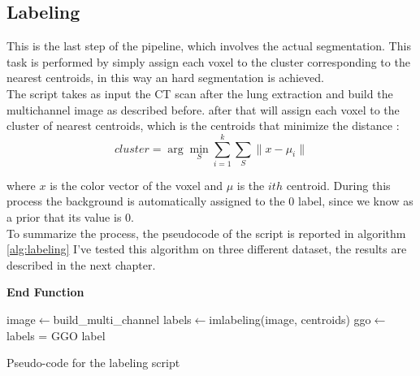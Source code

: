 
	
	\subsection{Labeling}
	
	This is the last step of the pipeline, which involves the actual segmentation. This task is performed by simply assign each voxel to the cluster corresponding to the nearest centroids, in this way an hard segmentation is achieved.\\
	
	The script takes as input the CT scan after the lung extraction and build the multichannel image as described before. after that will assign each voxel to the cluster of nearest centroids, which is the centroids that minimize the distance : 
	\begin{equation}
		cluster = \arg\min_{S}  \sum_{i=1}^k \sum_{S} \| x - \mu_i\|
	\end{equation}

	where $x$ is the color vector of the voxel and $\mu$ is the $ith$ centroid. During this process the background is automatically assigned to the 0 label, since we know as a prior that its value is $0$.\\
	To summarize the process, the pseudocode of the script is reported in algorithm\,\ref{alg:labeling}
	 I've tested this algorithm on three different dataset, the results are described in the next chapter.
	 
	 	\begin{algorithm}
	 	
	 	\SetAlgoLined
	 	\DontPrintSemicolon
	 	
	 	
	 	\textbf{\textbf{End Function}}
 	
 		
 		image$\leftarrow$build\_multi\_channel\;
 		labels$\leftarrow$imlabeling(image, centroids)\;
 		ggo$\leftarrow$ labels = GGO label\;
	 
	 	\caption{Pseudo-code for the labeling script}\label{alg:labeling}
	 
	 \end{algorithm}
	 
	
	
